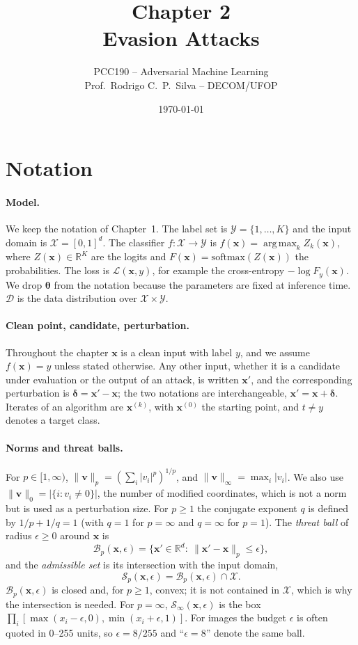 \documentclass[10pt,a4paper]{extarticle}
\title{Chapter 2\\Evasion Attacks}
\author{PCC190 -- Adversarial Machine Learning\\Prof.\ Rodrigo C.\ P.\ Silva -- DECOM/UFOP}
\date{\today}
\theoremstyle{definition}
\newcommand{\R}{\mathbb{R}}
\newcommand{\X}{\mathcal{X}}
\newcommand{\Y}{\mathcal{Y}}
\newcommand{\D}{\mathcal{D}}
\newcommand{\Loss}{\mathcal{L}}
\newcommand{\x}{\mathbf{x}}
\newcommand{\xadv}{\mathbf{x}'}
\newcommand{\bdelta}{\boldsymbol{\delta}}
\newcommand{\btheta}{\boldsymbol{\theta}}
\newcommand{\B}{\mathcal{B}}
\DeclareMathOperator*{\argmax}{arg\,max}
\begin{document}
\maketitle
\thispagestyle{fancy}
\tableofcontents

\section*{Notation}

\paragraph{Model.} We keep the notation of Chapter~1. The label set is \(\Y=\{1,\dots,K\}\) and the input domain is \(\X=[0,1]^d\). The classifier \(f:\X\to\Y\) is \(f(\x)=\argmax_k Z_k(\x)\), where \(Z(\x)\in\R^K\) are the logits and \(F(\x)=\mathrm{softmax}(Z(\x))\) the probabilities. The loss is \(\Loss(\x,y)\), for example the cross-entropy \(-\log F_y(\x)\). We drop \(\btheta\) from the notation because the parameters are fixed at inference time. \(\D\) is the data distribution over \(\X\times\Y\).

\paragraph{Clean point, candidate, perturbation.} Throughout the chapter \(\x\) is a clean input with label \(y\), and we assume \(f(\x)=y\) unless stated otherwise. Any other input, whether it is a candidate under evaluation or the output of an attack, is written \(\xadv\), and the corresponding perturbation is \(\bdelta=\xadv-\x\); the two notations are interchangeable, \(\xadv=\x+\bdelta\). Iterates of an algorithm are \(\x^{(k)}\), with \(\x^{(0)}\) the starting point, and \(t\neq y\) denotes a target class.

\paragraph{Norms and threat balls.} For \(p\in[1,\infty)\), \(\|\mathbf{v}\|_p=(\sum_i|v_i|^p)^{1/p}\), and \(\|\mathbf{v}\|_\infty=\max_i|v_i|\). We also use \(\|\mathbf{v}\|_0=|\{i: v_i\neq0\}|\), the number of modified coordinates, which is not a norm but is used as a perturbation size. For \(p\ge1\) the conjugate exponent \(q\) is defined by \(1/p+1/q=1\) (with \(q=1\) for \(p=\infty\) and \(q=\infty\) for \(p=1\)). The \emph{threat ball} of radius \(\epsilon\ge0\) around \(\x\) is
\[
\B_p(\x,\epsilon)=\{\xadv\in\R^d:\ \|\xadv-\x\|_p\le\epsilon\},
\]
and the \emph{admissible set} is its intersection with the input domain,
\[
\mathcal{S}_p(\x,\epsilon)=\B_p(\x,\epsilon)\cap\X .
\]
\(\B_p(\x,\epsilon)\) is closed and, for \(p\ge1\), convex; it is not contained in \(\X\), which is why the intersection is needed. For \(p=\infty\), \(\mathcal{S}_\infty(\x,\epsilon)\) is the box \(\prod_i[\max(x_i-\epsilon,0),\min(x_i+\epsilon,1)]\). For images the budget \(\epsilon\) is often quoted in 0--255 units, so \(\epsilon=8/255\) and \enquote{\(\epsilon=8\)} denote the same ball.
\end{document}
